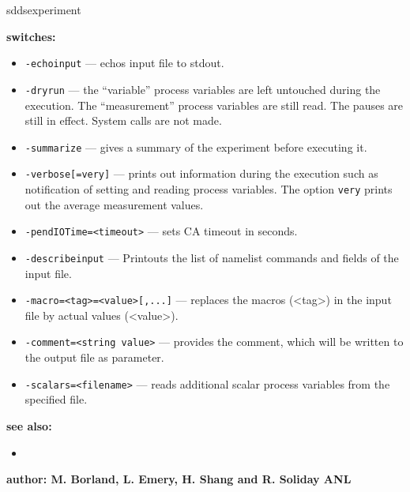 \begin{sddsprog}{sddsexperiment}
\item {\bf switches:}
    \begin{itemize}
    \item {\verb+-echoinput+} --- echos input file to stdout.
    \item {\verb+-dryrun+} --- the ``variable'' process variables are left untouched during the execution. The ``measurement''
                process variables are still read. The pauses are still in effect. System calls are not made.
    \item {\verb+-summarize+} --- gives a summary of the experiment before executing it.
    \item {\verb+-verbose[=very]+} --- prints out information during the execution such as notification of 
                setting and reading process variables. The option \verb+very+ prints out the average measurement values.
    \item {\verb+-pendIOTime=<timeout>+} --- sets CA timeout in seconds.
    \item {\verb+-describeinput+} --- Printouts the list of namelist commands and fields of the input file.
    \item {\verb+-macro=<tag>=<value>[,...]+} --- replaces the macros (<tag>) in the input file by actual values (<value>).
    \item {\verb+-comment=<string value>+} --- provides the comment, which will be written to the output file as parameter.
    \item {\verb+-scalars=<filename>+} --- reads additional scalar process variables from the specified file.
    \end{itemize}

\item {\bf see also:}
    \begin{itemize}
    \item {}
    \end{itemize}
\item {\bf author: M. Borland, L. Emery, H. Shang and R. Soliday ANL} 
\end{sddsprog}
